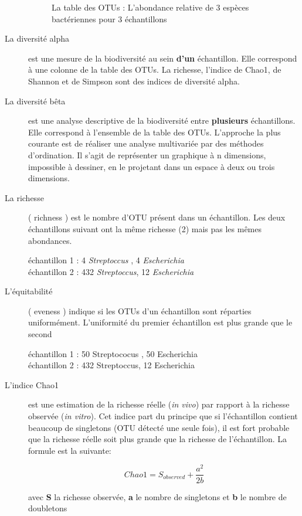 \documentclass[12pt,a4paper]{article}
\begin{document}
\begin{description}
\begin{figure}[h]
\begin{center}
\begin{tabular}{|l|c|c|c|c}
  \hline
\end{tabular}
\end{center}
\caption{La table des OTUs : L'abondance relative de 3 espèces bactériennes pour 3 échantillons}
\label{OTUTABLE}
\end{figure}

\item[La diversité alpha] est une mesure de la biodiversité au sein \textbf{d’un} échantillon. Elle correspond à une colonne de la table des OTUs. La richesse, l'indice de Chao1, de Shannon et de Simpson sont des indices de diversité alpha.

\item[La diversité bêta] est une analyse descriptive de la biodiversité entre \textbf{plusieurs} échantillons. Elle correspond à l’ensemble de la table des OTUs. L’approche la plus courante est de réaliser une analyse multivariée par des méthodes d’ordination. Il s’agit de représenter un graphique à n dimensions, impossible à dessiner, en le projetant dans un espace à deux ou trois dimensions.

\item[La richesse] ( richness ) est le nombre d'OTU présent dans un échantillon. Les deux échantillons suivant ont la même richesse (2) mais pas les mêmes abondances.

échantillon 1  : 4 \textit{Streptoccus} , 4 \textit{Escherichia}  \\ 
échantillon 2 : 432 \textit{Streptoccus}, 12 \textit{Escherichia} 

\item[L'équitabilité] ( eveness )  indique si les OTUs d’un échantillon sont réparties uniformément.
L'uniformité du premier échantillon est plus grande que le second

échantillon 1  : 50 Streptococus , 50 Escherichia  \\ 
échantillon 2 : 432 Streptoccus, 12 Escherichia 


\item[L'indice Chao1] est une estimation de la richesse réelle (\textit{in vivo}) par rapport à la richesse observée (\textit{in vitro}). Cet indice part du principe que si l’échantillon contient beaucoup de singletons (OTU détecté une seule fois), il est fort probable que la richesse réelle soit plus grande que la richesse de l’échantillon. La formule est la suivante:

\begin{mycapequ}[!h]
   \begin{equation}
     Chao1 = S_{observed} + \frac{a^2}{2b}
   \end{equation}
      \caption{avec \textbf{S} la richesse observée, \textbf{a} le nombre de singletons et \textbf{b} le nombre de doubletons}
\end{mycapequ}


\end{description}
\end{document}
